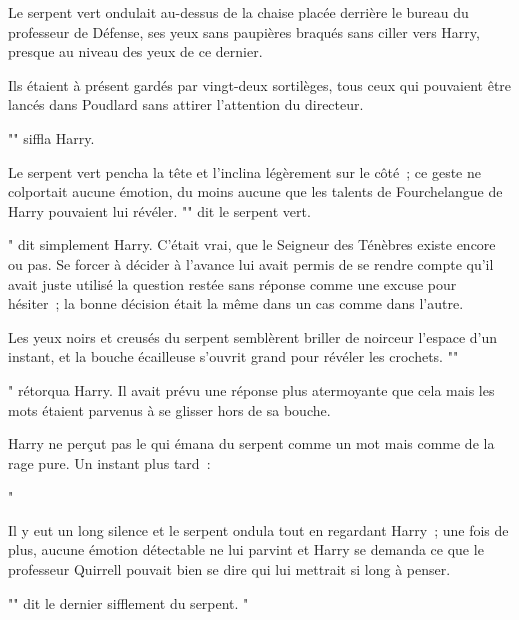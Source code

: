 Le serpent vert ondulait au-dessus de la chaise placée derrière le bureau du professeur de Défense, ses yeux sans paupières braqués sans ciller vers Harry, presque au niveau des yeux de ce dernier.

Ils étaient à présent gardés par vingt-deux sortilèges, tous ceux qui pouvaient être lancés dans Poudlard sans attirer l'attention du directeur.

"" siffla Harry.

Le serpent vert pencha la tête et l'inclina légèrement sur le côté~; ce geste ne colportait aucune émotion, du moins aucune que les talents de Fourchelangue de Harry pouvaient lui révéler. "" dit le serpent vert.

" dit simplement Harry. C'était vrai, que le Seigneur des Ténèbres existe encore ou pas. Se forcer à décider à l'avance lui avait permis de se rendre compte qu'il avait juste utilisé la question restée sans réponse comme une excuse pour hésiter~; la bonne décision était la même dans un cas comme dans l'autre.

Les yeux noirs et creusés du serpent semblèrent briller de noirceur l'espace d'un instant, et la bouche écailleuse s'ouvrit grand pour révéler les crochets. ""

" rétorqua Harry. Il avait prévu une réponse plus atermoyante que cela mais les mots étaient parvenus à se glisser hors de sa bouche.

Harry ne perçut pas le  qui émana du serpent comme un mot mais comme de la rage pure. Un instant plus tard~: 

"

Il y eut un long silence et le serpent ondula tout en regardant Harry~; une fois de plus, aucune émotion détectable ne lui parvint et Harry se demanda ce que le professeur Quirrell pouvait bien se dire qui lui mettrait si long à penser.

"" dit le dernier sifflement du serpent. "

